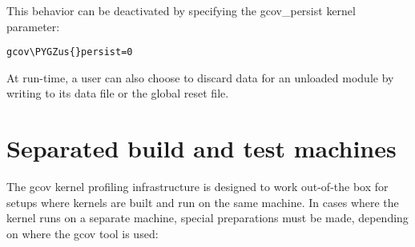 \documentclass[a4paper,8pt,english]{sphinxmanual}
\def\PYGZus{\char`\_}
\begin{document}
This behavior can be deactivated by specifying the gcov\_persist kernel
parameter:

\begin{Verbatim}[commandchars=\\\{\}]
gcov\PYGZus{}persist=0
\end{Verbatim}

At run-time, a user can also choose to discard data for an unloaded
module by writing to its data file or the global reset file.


\section{Separated build and test machines}
\label{dev-tools/gcov:separated-build-and-test-machines}
The gcov kernel profiling infrastructure is designed to work out-of-the
box for setups where kernels are built and run on the same machine. In
cases where the kernel runs on a separate machine, special preparations
must be made, depending on where the gcov tool is used:
\end{document}
